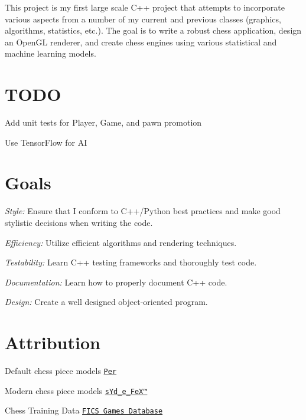 This project is my first large scale C++ project that attempts to incorporate various aspects from a number of my current and previous classes (graphics, algorithms, statistics, etc.). The goal is to write a robust chess application, design an Open\+GL renderer, and create chess engines using various statistical and machine learning models.

\section*{T\+O\+DO}


\begin{DoxyItemize}
\item Add unit tests for Player, Game, and pawn promotion
\item Use Tensor\+Flow for AI
\end{DoxyItemize}

\section*{Goals}


\begin{DoxyItemize}
\item {\itshape Style\+:} Ensure that I conform to C++/\+Python best practices and make good stylistic decisions when writing the code.
\item {\itshape Efficiency\+:} Utilize efficient algorithms and rendering techniques.
\item {\itshape Testability\+:} Learn C++ testing frameworks and thoroughly test code.
\item {\itshape Documentation\+:} Learn how to properly document C++ code.
\item {\itshape Design\+:} Create a well designed object-\/oriented program.
\end{DoxyItemize}

\section*{Attribution}


\begin{DoxyItemize}
\item Default chess piece models \href{https://grabcad.com/library/complete-chess-set-1}{\tt Per}
\item Modern chess piece models \href{https://grabcad.com/library/chess-mania-2}{\tt s\+Yd\+\_\+e\+\_\+\+Fe\+X™}
\item Chess Training Data \href{http://ficsgames.org/}{\tt F\+I\+CS Games Database}
\end{DoxyItemize}

